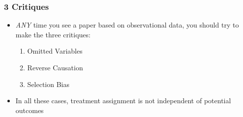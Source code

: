 \documentclass[xcolor=x11names,compress]{beamer}\usepackage[]{graphicx}\usepackage[]{xcolor}
\renewcommand{\(}{\begin{columns}}
\renewcommand{\)}{\end{columns}}
\newcommand{\<}[1]{\begin{column}{#1}}
\renewcommand{\>}{\end{column}}
\begin{document}
\begin{frame}
\frametitle{3 Critiques}
\begin{itemize}
\item \textit{ANY} time you see a paper based on observational data, you should try to make the three critiques:
\pause
\begin{enumerate}
\item Omitted Variables
\item Reverse Causation
\item Selection Bias
\end{enumerate}
\item In all these cases, treatment assignment is not independent of potential outcomes
\end{itemize}
\end{frame}
\end{document}
